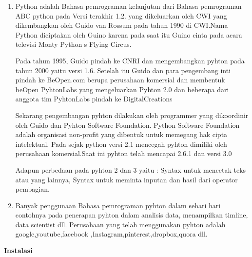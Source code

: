 \begin{enumerate}
\item Python adalah Bahasa pemrograman kelanjutan dari Bahasa pemrograman ABC python pada  Versi terakhir 1.2. yang dikeluarkan oleh CWI yang dikembangkan oleh Guido van Rossum pada tahun 1990 di CWI.Nama Python diciptakan oleh Guino karena pada saat itu Guino cinta pada acara televisi Monty Python s Flying Circus.
\par
Pada tahun 1995, Guido pindah ke CNRI dan mengembangkan pyhton pada tahun 2000 yaitu versi 1.6. Setelah itu Guido dan para pengembang inti pindah ke BeOpen.com berupa perusahaan komersial dan membentuk beOpen PyhtonLabs yang mengeluarkan Pyhton 2.0 dan beberapa dari anggota tim PyhtonLabs pindah ke DigitalCreations
\par
Sekarang pengembangan pyhton dilakukan oleh programmer yang dikoordinir oleh Guido dan Pyhton Software Foundation. Python Software Foundation adalah organisasi non-profit yang dibentuk untuk memegang hak cipta intelektual. Pada sejak python versi 2.1 mencegah pyhton dimiliki oleh perusahaan komersial.Saat ini pyhton telah mencapai 2.6.1 dan versi 3.0
\par
Adapun perbedaan pada pyhton 2 dan 3 yaitu : Syntax untuk mencetak teks atau yang lainnya, Syntax untuk meminta inputan dan hasil dari operator pembagian.

    \item Banyak penggunaan Bahasa pemrograman pyhton dalam sehari hari contohnya pada penerapan pyhton dalam analisis data, menampilkan timline, data scientist dll. Perusahaan yang telah menggunakan pyhton adalah google,youtube,facebook
    ,Instagram,pinterest,dropbox,quora dll.
\end{enumerate}
\textbf{Instalasi}
